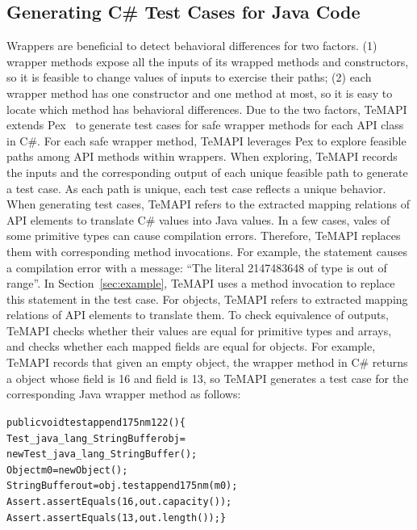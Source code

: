 \subsection{Generating C\# Test Cases for Java Code}
\label{sec:approach:single}
Wrappers are beneficial to detect behavioral differences for two factors. (1) wrapper methods expose all the inputs of its wrapped methods and constructors, so it is feasible to change values of inputs to exercise their paths; (2) each wrapper method has one constructor and one method at most, so it is easy to locate which method has behavioral differences. Due to the two factors, TeMAPI extends Pex~\cite{tillmann2008pex} to generate test cases for safe wrapper methods for each API class in C\#. For each safe wrapper method, TeMAPI leverages Pex to explore feasible paths among API methods within wrappers. When exploring, TeMAPI records the inputs and the corresponding output of each unique feasible path to generate a test case. As each path is unique, each test case reflects a unique behavior. When generating test cases, TeMAPI refers to the extracted mapping relations of API elements to translate C\# values into Java values. In a few cases, vales of some primitive types can cause compilation errors. Therefore, TeMAPI replaces them with corresponding method invocations. For example, the  statement causes a compilation error with a message: ``The literal 2147483648 of type  is out of range''. In Section~\ref{sec:example}, TeMAPI uses a method invocation to replace this statement in the  test case. For objects, TeMAPI refers to extracted mapping relations of API elements to translate them. To check equivalence of outputs, TeMAPI checks whether their values are equal for primitive types and arrays, and checks whether each mapped fields are equal for objects. For example, TeMAPI records that given an empty object, the  wrapper method in C\# returns a  object whose  field is 16 and  field is 13, so TeMAPI generates a test case for the corresponding Java wrapper method as follows:

\begin{CodeOut}\vspace*{-1.5ex}
\begin{alltt}
public void testappend175nm122()\{
  Test_java_lang_StringBuffer obj =
      new Test_java_lang_StringBuffer();
  Object m0 = new Object();
  StringBuffer out = obj.testappend175nm(m0);
  Assert.assertEquals(16, out.capacity());	
  Assert.assertEquals(13, out.length());\}
\end{alltt}
\end{CodeOut}\vspace*{-2ex}

